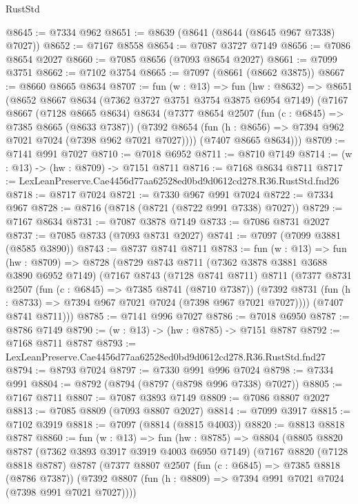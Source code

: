 \begin{lexlean}{RustStd}
\begin{coremodule}
@8645 := @7334 @962
@8651 := @8639 (@8641 (@8644 (@8645 @967 @7338) @7027))
@8652 := @7167 @8558
@8654 := @7087 @3727 @7149
@8656 := @7086 @8654 @2027
@8660 := @7085 @8656 (@7093 @8654 @2027)
@8661 := @7099 @3751
@8662 := @7102 @3754
@8665 := @7097 (@8661 (@8662 @3875))
@8667 := @8660 @8665 @8634
@8707 := fun (w : @13) =>
  fun (hw : @8632) =>
  @8651
    (@8652
      @8667
      @8634
      (@7362 @3727 @3751 @3754 @3875 @6954 @7149)
      (@7167
        @8667
        (@7128 @8665 @8634)
        @8634
        (@7377
          @8654
          @2507
          (fun (c : @6845) => @7385 @8665 (@8633 @7387))
          (@7392 @8654 (fun (h : @8656) => @7394 @962 @7021 @7024 (@7398 @962 @7021 @7027))))
        (@7407 @8665 @8634)))
@8709 := @7141 @991 @7027
@8710 := @7018 @6952
@8711 := @8710 @7149
@8714 := (w : @13) -> (hw : @8709) -> @7151 @8711
@8716 := @7168 @8634 @8711
@8717 := LexLeanPreserve.Cae4456d77aa62528ed0bd9d0612cd278.R36.RustStd.fnd26
@8718 := @8717 @7024
@8721 := @7330 @967 @991 @7024
@8722 := @7334 @967
@8728 := @8716 (@8718 (@8721 (@8722 @991 @7338) @7027))
@8729 := @7167 @8634
@8731 := @7087 @3878 @7149
@8733 := @7086 @8731 @2027
@8737 := @7085 @8733 (@7093 @8731 @2027)
@8741 := @7097 (@7099 @3881 (@8585 @3890))
@8743 := @8737 @8741 @8711
@8783 := fun (w : @13) =>
  fun (hw : @8709) =>
  @8728
    (@8729
      @8743
      @8711
      (@7362 @3878 @3881 @3688 @3890 @6952 @7149)
      (@7167
        @8743
        (@7128 @8741 @8711)
        @8711
        (@7377
          @8731
          @2507
          (fun (c : @6845) => @7385 @8741 (@8710 @7387))
          (@7392 @8731 (fun (h : @8733) => @7394 @967 @7021 @7024 (@7398 @967 @7021 @7027))))
        (@7407 @8741 @8711)))
@8785 := @7141 @996 @7027
@8786 := @7018 @6950
@8787 := @8786 @7149
@8790 := (w : @13) -> (hw : @8785) -> @7151 @8787
@8792 := @7168 @8711 @8787
@8793 := LexLeanPreserve.Cae4456d77aa62528ed0bd9d0612cd278.R36.RustStd.fnd27
@8794 := @8793 @7024
@8797 := @7330 @991 @996 @7024
@8798 := @7334 @991
@8804 := @8792 (@8794 (@8797 (@8798 @996 @7338) @7027))
@8805 := @7167 @8711
@8807 := @7087 @3893 @7149
@8809 := @7086 @8807 @2027
@8813 := @7085 @8809 (@7093 @8807 @2027)
@8814 := @7099 @3917
@8815 := @7102 @3919
@8818 := @7097 (@8814 (@8815 @4003))
@8820 := @8813 @8818 @8787
@8860 := fun (w : @13) =>
  fun (hw : @8785) =>
  @8804
    (@8805
      @8820
      @8787
      (@7362 @3893 @3917 @3919 @4003 @6950 @7149)
      (@7167
        @8820
        (@7128 @8818 @8787)
        @8787
        (@7377
          @8807
          @2507
          (fun (c : @6845) => @7385 @8818 (@8786 @7387))
          (@7392 @8807 (fun (h : @8809) => @7394 @991 @7021 @7024 (@7398 @991 @7021 @7027))))

\end{coremodule}
\end{lexlean}
